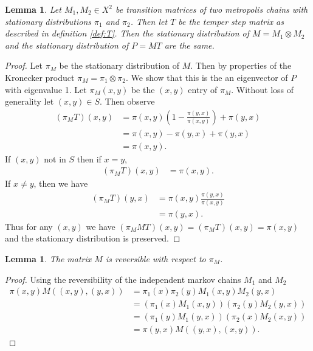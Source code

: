 \documentclass{amsart}
\newtheorem{lemma}[definition]{Lemma}
\newcommand{\1}{\mathbbm{1}}
\begin{document}
\begin{lemma}\label{lem:pi}
    Let $M_1,M_2\in X^2$ be transition matrices of two metropolis chains with stationary distributions $\pi_1$ and $\pi_2$. Then let $T$ be the temper step matrix as described in definition \ref{def:T}. Then the stationary distribution of $M=M_1\otimes M_2$ and the stationary distribution of $P=MT$ are the same.
\end{lemma}
\begin{proof}
    Let $\pi_M$ be the stationary distribution of $M$. Then by properties of the Kronecker product $\pi_M=\pi_1\otimes \pi_2$. We show that this is the an eigenvector of $P$ with eigenvalue 1. Let $\pi_M(x,y)$ be the $(x,y)$ entry of $\pi_M$. Without loss of generality let $(x,y)\in S$. Then observe 
    \begin{align*}
        (\pi_MT)(x,y)&=\pi(x,y)\left(1-\frac{\pi(y,x)}{\pi(x,y)}\right)+\pi(y,x)\\
        &=\pi(x,y)-\pi(y,x)+\pi(y,x)\\
        &=\pi(x,y).
    \end{align*}
    If $(x,y)$ not in $S$ then if $x=y$,
    \begin{align*}
        (\pi_MT)(x,y)&=\pi(x,y).
    \end{align*}
    If $x\neq y$, then we have
    \begin{align*}
        (\pi_MT)(y,x)&=\pi(x,y)\frac{\pi(y,x)}{\pi(x,y)}\\
        &=\pi(y,x).
    \end{align*}
    Thus for any $(x,y)$ we have $(\pi_M MT)(x,y)=(\pi_MT)(x,y)=\pi(x,y)$ and the stationary distribution is preserved.
\end{proof}

\begin{lemma}\label{lem:M_rev}
    The matrix $M$ is reversible with respect to $\pi_M$.
\end{lemma}
\begin{proof}
    Using the reversibility of the independent markov chains $M_1$ and $M_2$
    \begin{align*}
        \pi(x,y)M((x,y),(y,x))&=\pi_1(x)\pi_2(y)M_1(x,y)M_2(y,x)\\
        &=(\pi_1(x)M_1(x,y))(\pi_2(y)M_2(y,x))\\
        &=(\pi_1(y)M_1(y,x))(\pi_2(x)M_2(x,y))\\
        &=\pi(y,x)M((y,x),(x,y)).
    \end{align*}
\end{proof}
\end{document}
